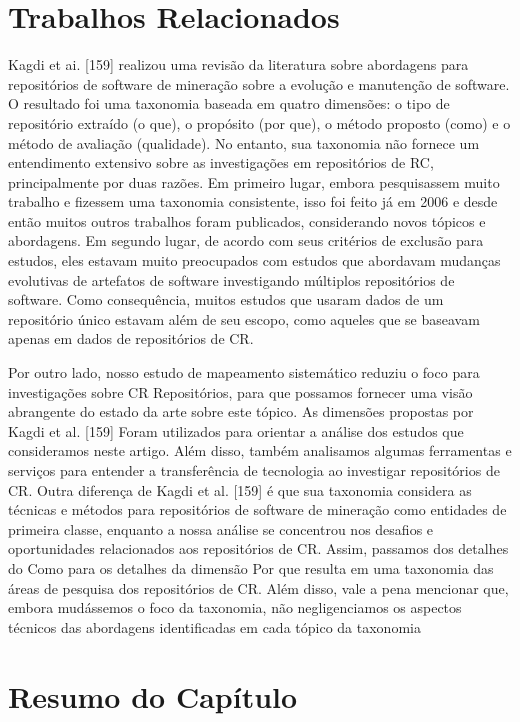 \section{Trabalhos Relacionados}
Kagdi et ai. [159] realizou uma revisão da literatura sobre abordagens para
repositórios de software de mineração sobre a evolução e manutenção de software.
O resultado foi uma taxonomia baseada em quatro dimensões: o tipo de repositório
extraído (o que), o propósito (por que), o método proposto (como) e o método de
avaliação (qualidade). No entanto, sua taxonomia não fornece um entendimento
extensivo sobre as investigações em repositórios de RC, principalmente por duas
razões. Em primeiro lugar, embora pesquisassem muito trabalho e fizessem uma
taxonomia consistente, isso foi feito já em 2006 e desde então muitos outros
trabalhos foram publicados, considerando novos tópicos e abordagens. Em segundo
lugar, de acordo com seus critérios de exclusão para estudos, eles estavam muito
preocupados com estudos que abordavam mudanças evolutivas de artefatos de
software investigando múltiplos repositórios de software. Como consequência,
muitos estudos que usaram dados de um repositório único estavam além de seu
escopo, como aqueles que se baseavam apenas em dados de repositórios de CR.

Por outro lado, nosso estudo de mapeamento sistemático reduziu o foco para
investigações sobre CR Repositórios, para que possamos fornecer uma visão
abrangente do estado da arte sobre este tópico. As dimensões propostas por Kagdi
et al. [159] Foram utilizados para orientar a análise dos estudos que
consideramos neste artigo. Além disso, também analisamos algumas ferramentas e
serviços para entender a transferência de tecnologia ao investigar repositórios
de CR. Outra diferença de Kagdi et al. [159] é que sua taxonomia considera as
técnicas e métodos para repositórios de software de mineração como entidades de
primeira classe, enquanto a nossa análise se concentrou nos desafios e
oportunidades relacionados aos repositórios de CR. Assim, passamos dos detalhes
do Como para os detalhes da dimensão Por que resulta em uma taxonomia das áreas
de pesquisa dos repositórios de CR. Além disso, vale a pena mencionar que,
embora mudássemos o foco da taxonomia, não negligenciamos os aspectos técnicos
das abordagens identificadas em cada tópico da taxonomia

\section{Resumo do Capítulo}
